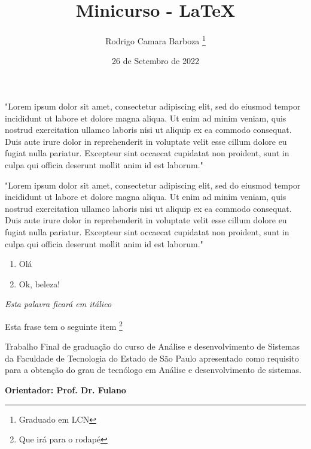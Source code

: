 \documentclass[12pt, a4paper, oneside]{book}
\begin{document}
\tableofcontents
\listoffigures

\title{Minicurso - LaTeX}
\author {Rodrigo Camara Barboza \footnote{Graduado em LCN}}
\date {26 de Setembro de 2022}
\maketitle

"Lorem ipsum dolor sit amet, consectetur adipiscing elit, sed do eiusmod tempor incididunt ut labore et dolore magna aliqua. Ut enim ad minim veniam, quis nostrud exercitation ullamco laboris nisi ut aliquip ex ea commodo consequat. Duis aute irure dolor in reprehenderit in voluptate velit esse cillum dolore eu fugiat nulla pariatur. Excepteur sint occaecat cupidatat non proident, sunt in culpa qui officia deserunt mollit anim id est laborum." \newline

"Lorem ipsum dolor sit amet, consectetur adipiscing elit, sed do eiusmod tempor incididunt ut labore et dolore magna aliqua. Ut enim ad minim veniam, quis nostrud exercitation ullamco laboris nisi ut aliquip ex ea commodo consequat. Duis aute irure dolor in reprehenderit in voluptate velit esse cillum dolore eu fugiat nulla pariatur. Excepteur sint occaecat cupidatat non proident, sunt in culpa qui officia deserunt mollit anim id est laborum."


\begin{enumerate}
	\item Olá
	\item Ok, beleza!
\end{enumerate}

\textit {Esta palavra ficará em itálico}

Esta frase tem o seguinte item \footnote{Que irá para o rodapé}

%

\vspace{1cm}

\begin{flushright}

\begin{minipage}[t]{12cm}
\hrulefill

Trabalho Final de graduação do curso de Análise e desenvolvimento de Sistemas da Faculdade de Tecnologia do Estado de São Paulo apresentado como requisito para a obtenção do grau de tecnólogo em Análise e desenvolvimento de sistemas.

\hrulefill

\vspace{0.2cm}

{\bf Orientador: Prof. Dr. Fulano}

\end{minipage}

\end{flushright}
\newpage
\end{document}
